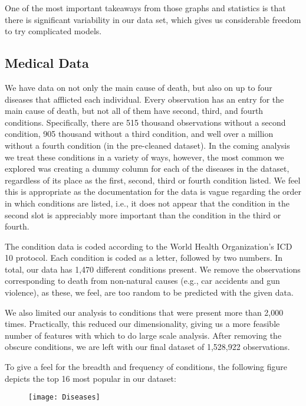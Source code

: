 \documentclass[letterpaper, 10 pt, conference]{ieeeconf}  %
\begin{document}
One of the most important takeaways from those graphs and statistics is that there is significant variability in our data set, which gives us considerable freedom to try complicated models.

\subsection{Medical Data}
We have data on not only the main cause of death, but also on up to four diseases that afflicted each individual. Every observation has an entry for the main cause of death, but not all of them have second, third, and fourth conditions. Specifically, there are 515 thousand observations without a second condition, 905 thousand without a third condition, and well over a million without a fourth condition (in the pre-cleaned dataset). In the coming analysis we treat these conditions in a variety of ways, however, the most common we explored was creating a dummy column for each of the diseases in the dataset, regardless of its place as the first, second, third or fourth condition listed. We feel this is appropriate as the documentation for the data is vague regarding the order in which conditions are listed, i.e., it does not appear that the condition in the second slot is appreciably more important than the condition in the third or fourth. 

The condition data is coded according to the World Health Organization's ICD 10 protocol. Each condition is coded as a letter, followed by two numbers. In total, our data has 1,470 different conditions present. We remove the observations corresponding to death from non-natural causes (e.g., car accidents and gun violence), as these, we feel, are too random to be predicted with the given data.

We also limited our analysis to conditions that were present more than 2,000 times. Practically, this reduced our dimensionality, giving us a more feasible number of features with which to do large scale analysis. After removing the obscure conditions, we are left with our final dataset of 1,528,922 observations.

To give a feel for the breadth and frequency of conditions, the following figure depicts the top 16 most popular in our dataset:
\begin{figure}[ht]
\label{Condition Distribution}
\begin{center}
\texttt{[image: Diseases]}
\end{center}
\end{figure}
\end{document}

